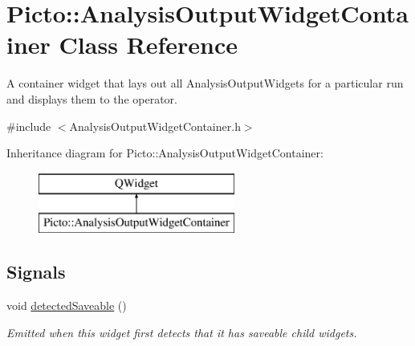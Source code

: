 \hypertarget{class_picto_1_1_analysis_output_widget_container}{\section{Picto\-:\-:Analysis\-Output\-Widget\-Container Class Reference}
\label{class_picto_1_1_analysis_output_widget_container}
}


A container widget that lays out all Analysis\-Output\-Widgets for a particular run and displays them to the operator.  




{\ttfamily \#include $<$Analysis\-Output\-Widget\-Container.\-h$>$}

Inheritance diagram for Picto\-:\-:Analysis\-Output\-Widget\-Container\-:\begin{figure}[H]
\begin{center}
\leavevmode
\includegraphics[height=2.000000cm]{class_picto_1_1_analysis_output_widget_container}
\end{center}
\end{figure}
\subsection*{Signals}
\begin{DoxyCompactItemize}
\item 
\hypertarget{class_picto_1_1_analysis_output_widget_container_aa6f1046005005642cb58fcbac0554194}{void \hyperlink{class_picto_1_1_analysis_output_widget_container_aa6f1046005005642cb58fcbac0554194}{detected\-Saveable} ()}\label{class_picto_1_1_analysis_output_widget_container_aa6f1046005005642cb58fcbac0554194}

\begin{DoxyCompactList}\small\item\em Emitted when this widget first detects that it has saveable child widgets. \end{DoxyCompactList}\end{DoxyCompactItemize}
